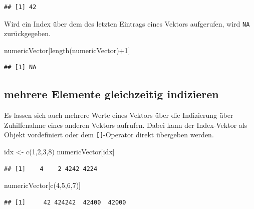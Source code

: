 \documentclass[
]{book}
\newenvironment{Shaded}{\begin{snugshade}}{\end{snugshade}}
\newcommand{\DecValTok}[1]{\textcolor[rgb]{0.00,0.00,0.81}{#1}}
\newcommand{\FunctionTok}[1]{\textcolor[rgb]{0.00,0.00,0.00}{#1}}
\newcommand{\NormalTok}[1]{#1}
\newcommand{\OtherTok}[1]{\textcolor[rgb]{0.56,0.35,0.01}{#1}}
\newcommand{\SpecialCharTok}[1]{\textcolor[rgb]{0.00,0.00,0.00}{#1}}
\begin{document}
\begin{verbatim}
## [1] 42
\end{verbatim}

Wird ein Index über dem des letzten Eintrags eines Vektors aufgerufen, wird \texttt{NA} zurückgegeben.

\begin{Shaded}
\begin{Highlighting}[]
\NormalTok{numericVector[}\FunctionTok{length}\NormalTok{(numericVector)}\SpecialCharTok{+}\DecValTok{1}\NormalTok{]}
\end{Highlighting}
\end{Shaded}

\begin{verbatim}
## [1] NA
\end{verbatim}

\hypertarget{mehrere-elemente-gleichzeitig-indizieren}{%
\subsection{mehrere Elemente gleichzeitig indizieren}\label{mehrere-elemente-gleichzeitig-indizieren}}

Es lassen sich auch mehrere Werte eines Vektors über die Indizierung über Zuhilfenahme eines anderen Vektors aufrufen. Dabei kann der Index-Vektor als Objekt vordefiniert oder dem \texttt{{[}{]}}-Operator direkt übergeben werden.

\begin{Shaded}
\begin{Highlighting}[]
\NormalTok{idx }\OtherTok{\textless{}{-}} \FunctionTok{c}\NormalTok{(}\DecValTok{1}\NormalTok{,}\DecValTok{2}\NormalTok{,}\DecValTok{3}\NormalTok{,}\DecValTok{8}\NormalTok{)}
\NormalTok{numericVector[idx]}
\end{Highlighting}
\end{Shaded}

\begin{verbatim}
## [1]    4    2 4242 4224
\end{verbatim}

\begin{Shaded}
\begin{Highlighting}[]
\NormalTok{numericVector[}\FunctionTok{c}\NormalTok{(}\DecValTok{4}\NormalTok{,}\DecValTok{5}\NormalTok{,}\DecValTok{6}\NormalTok{,}\DecValTok{7}\NormalTok{)]}
\end{Highlighting}
\end{Shaded}

\begin{verbatim}
## [1]     42 424242  42400  42000
\end{verbatim}
\end{document}
